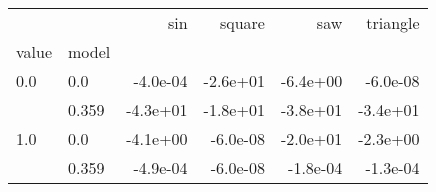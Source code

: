 \begin{tabular}{llrrrr}
\toprule
    &       &      sin &   square &      saw &  triangle \\
value & model &          &          &          &           \\
\midrule
0.0 & 0.0 & -4.0e-04 & -2.6e+01 & -6.4e+00 &  -6.0e-08 \\
    & 0.359 & -4.3e+01 & -1.8e+01 & -3.8e+01 &  -3.4e+01 \\
1.0 & 0.0 & -4.1e+00 & -6.0e-08 & -2.0e+01 &  -2.3e+00 \\
    & 0.359 & -4.9e-04 & -6.0e-08 & -1.8e-04 &  -1.3e-04 \\
\bottomrule
\end{tabular}
